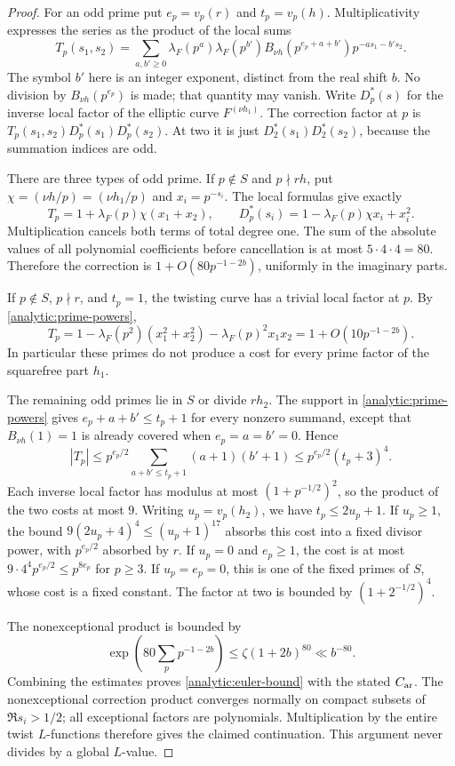 \begin{proof}
For an odd prime put $e_p=v_p(r)$ and $t_p=v_p(h)$. Multiplicativity
expresses the series as the product of the local sums
\[
 T_p(s_1,s_2)=\sum_{a,b'\geq0}
 \lambda_F(p^a)\lambda_F(p^{b'})
 B_{\nu h}(p^{e_p+a+b'})p^{-as_1-b's_2}.
\]
The symbol $b'$ here is an integer exponent, distinct from the real
shift $b$. No division by $B_{\nu h}(p^{e_p})$ is made; that quantity
may vanish. Write $D_p^*(s)$ for the inverse local factor of the
elliptic curve $F^{(\nu h_1)}$. The correction factor at $p$ is
$T_p(s_1,s_2)D_p^*(s_1)D_p^*(s_2)$. At two it is just
$D_2^*(s_1)D_2^*(s_2)$, because the summation indices are odd.

There are three types of odd prime. If $p\notin S$ and $p\nmid rh$,
put $\chi=(\nu h/p)=(\nu h_1/p)$ and $x_i=p^{-s_i}$. The local
formulas give exactly
\[
 T_p=1+\lambda_F(p)\chi(x_1+x_2),\qquad
 D_p^*(s_i)=1-\lambda_F(p)\chi x_i+x_i^2.
\]
Multiplication cancels both terms of total degree one. The sum of the
absolute values of all polynomial coefficients before cancellation is
at most $5\cdot4\cdot4=80$. Therefore the correction is
$1+O(80p^{-1-2b})$, uniformly in the imaginary parts.

If $p\notin S$, $p\nmid r$, and $t_p=1$, the twisting curve has a
trivial local factor at $p$. By \eqref{analytic:prime-powers},
\[
 T_p=1-\lambda_F(p^2)(x_1^2+x_2^2)-\lambda_F(p)^2x_1x_2
     =1+O(10p^{-1-2b}).
\]
In particular these primes do not produce a cost for every prime
factor of the squarefree part $h_1$.

The remaining odd primes lie in $S$ or divide $rh_2$. The support in
\eqref{analytic:prime-powers} gives $e_p+a+b'\leq t_p+1$ for every
nonzero summand, except that $B_{\nu h}(1)=1$ is already covered when
$e_p=a=b'=0$. Hence
\[
 |T_p|\leq p^{e_p/2}
       \sum_{a+b'\leq t_p+1}(a+1)(b'+1)
 \leq p^{e_p/2}(t_p+3)^4.
\]
Each inverse local factor has modulus at most
$(1+p^{-1/2})^2$, so the product of the two costs at most $9$.
Writing $u_p=v_p(h_2)$, we have $t_p\leq2u_p+1$.
If $u_p\geq1$, the bound
$9(2u_p+4)^4\leq(u_p+1)^{17}$ absorbs this cost into a fixed divisor
power, with $p^{e_p/2}$ absorbed by $r$.
If $u_p=0$ and $e_p\geq1$, the cost is at most
$9\cdot4^4p^{e_p/2}\leq p^{8e_p}$ for $p\geq3$.
If $u_p=e_p=0$, this is one of the fixed primes of $S$, whose cost
is a fixed constant. The factor at two is bounded by
$(1+2^{-1/2})^4$.

The nonexceptional product is bounded by
\[
 \exp\left(80\sum_p p^{-1-2b}\right)
 \leq\zeta(1+2b)^{80}\ll b^{-80}.
\]
Combining the estimates proves \eqref{analytic:euler-bound} with the
stated $C_{\rm ar}$. The nonexceptional correction product converges
normally on compact subsets of $\Re s_i>1/2$; all exceptional factors
are polynomials. Multiplication by the entire twist $L$-functions
therefore gives the claimed continuation. This argument never divides
by a global $L$-value.
\end{proof}

